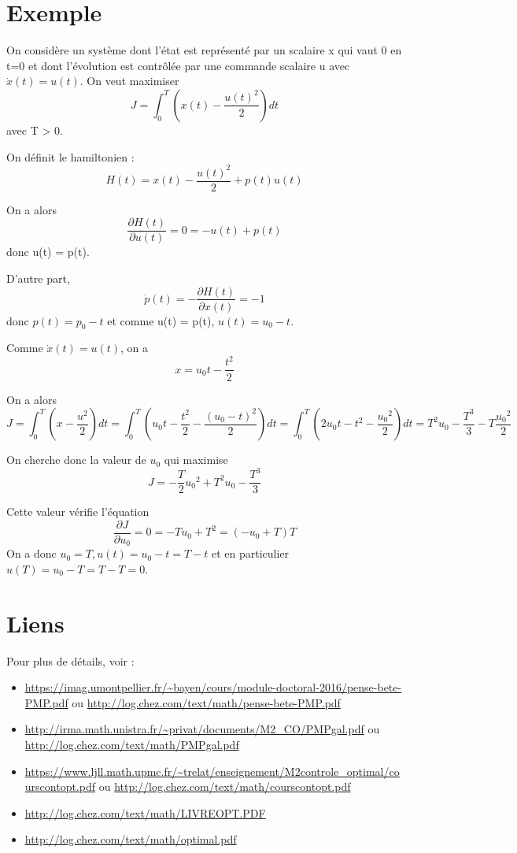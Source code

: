 \documentclass[10pt]{article}
\begin{document}
\section{Exemple}

On considère un système dont l'état est représenté par un scalaire x qui vaut 0 en t=0 et dont l'évolution est contrôlée par une commande scalaire u avec \( \dot{x}(t) = u(t) \). On veut maximiser 
\[ J = \int_0^T (x(t) - \frac{u(t)^2}{2}) dt \]
avec T > 0.

On définit le hamiltonien :
\[ H(t) = x(t) - \frac{u(t)^2}{2} + p(t) u(t) \]

On a alors 
\[ \frac{\partial H(t)}{\partial u(t)} = 0 = - u(t) + p(t) \]
donc u(t) = p(t).

D'autre part,
\[ \dot{p}(t) = - \frac{\partial H(t)}{\partial x(t)} = -1 \]
donc \( p(t) = p_0 - t \) et comme u(t) = p(t), \( u(t) = u_0 - t \).

Comme \( \dot{x}(t) = u(t) \), on a
\[ x = u_0 t - \frac{t^2}{2} \]

On a alors
\[ J = \int_0^T (x - \frac{u^2}{2}) dt = \int_0^T (u_0 t - \frac{t^2}{2} - \frac{(u_0 - t)^2}{2}) dt = \int_0^T (2 u_0 t - t^2 - \frac{{u_0}^2}{2}) dt = T^2 u_0 - \frac{T^3}{3} - T \frac{{u_0}^2}{2} \]

On cherche donc la valeur de \( u_0 \) qui maximise
\[ J = - \frac{T}{2} {u_0}^2 + T^2 u_0 - \frac{T^3}{3} \]

Cette valeur vérifie l'équation 
\[ \frac{\partial J}{\partial u_0} = 0 = - T u_0 + T^2 = (- u_0 + T) T \]
On a donc \( u_0 = T, u(t) = u_0 - t = T - t \) et en particulier \( u(T) = u_0 - T = T - T = 0 \). 


\section{Liens}

Pour plus de détails, voir :
\begin{itemize}
     \setlength{\itemsep}{1pt}
     \setlength{\parskip}{0pt}
     \setlength{\parsep}{0pt}
\item \url{https://imag.umontpellier.fr/~bayen/cours/module-doctoral-2016/pense-bete-PMP.pdf} ou \url{http://log.chez.com/text/math/pense-bete-PMP.pdf}
\item \url{http://irma.math.unistra.fr/~privat/documents/M2_CO/PMPgal.pdf} ou \url{http://log.chez.com/text/math/PMPgal.pdf}
\item \url{https://www.ljll.math.upmc.fr/~trelat/enseignement/M2controle_optimal/courscontopt.pdf} ou \url {http://log.chez.com/text/math/courscontopt.pdf}
\item \url{http://log.chez.com/text/math/LIVREOPT.PDF}
\item \url{http://log.chez.com/text/math/optimal.pdf}
\end{itemize}
\end{document}
